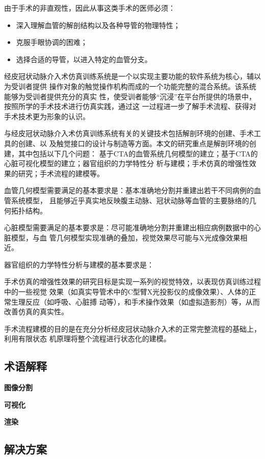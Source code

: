 由于手术的非直观性，因此从事这类手术的医师必须\cite{Li2012CUHK}：

\begin{itemize}
  \item 深入理解血管的解剖结构以及各种导管的物理特性；
  \item 克服手眼协调的困难；
  \item 选择合适的导管，以进入特定的血管分支。
\end{itemize}

经皮冠状动脉介入术仿真训练系统是一个以实现主要功能的软件系统为核心，辅以为受训者提供
操作对象的触觉操作机构而成的一个功能完整的混合系统。该系统能够为受训者提供充分的真实
性，使受训者能够“沉浸”在平台所提供的场景中，按照所学的手术技术进行仿真实践，通过这
一过程进一步了解手术流程、获得对手术技术更为形象的认识。

与经皮冠状动脉介入术仿真训练系统有关的关键技术包括解剖环境的创建、手术工具的创建、以
及触觉接口的设计与制造等方面。本文的研究重点是解剖环境的创建，其中包括以下几个问题：
基于CTA的血管系统几何模型的建立；基于CTA的心脏可视化模型的建立；器官组织的力学特性分
析与建模；手术仿真的增强性效果的研究；手术流程的建模等。

血管几何模型需要满足的基本要求是：基本准确地分割并重建出若干不同病例的血管系统模型，
且能够近乎真实地反映腹主动脉、冠状动脉等血管的主要脉络的几何拓扑结构。

心脏模型需要满足的基本要求是：尽可能准确地分割并重建出相应病例数据中的心脏模型，与血
管几何模型实现准确的叠加，视觉效果尽可能与X光成像效果相近。

器官组织的力学特性分析与建模的基本要求是：

手术仿真的增强性效果的研究目标是实现一系列的视觉特效，以表现仿真训练过程中的一些视觉
效果（如真实导管术中的C型臂X光投影仪的成像效果）、人体的正常生理反应（如呼吸、心脏搏
动等），和手术操作效果（如虚拟造影剂）等，从而改善仿真的真实性。

手术流程建模的目的是在充分分析经皮冠状动脉介入术的正常完整流程的基础上，利用有限状态
机原理将整个流程进行状态化的建模。

\subsection{术语解释}
\label{subsec1-1-2}

\textbf{图像分割}

\textbf{可视化}

\textbf{渲染}

\subsection{解决方案}
\label{subsec1-1-3}

